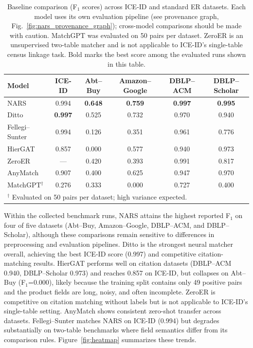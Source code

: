 \documentclass{article}
\begin{document}
\begin{table}[H]
  \centering
  \caption{Baseline comparison (F$_1$ scores) across ICE-ID and standard ER datasets. Each model uses its own evaluation pipeline (see provenance graph, Fig.~\ref{fig:nars_provenance_graph}); cross-model comparisons should be made with caution. MatchGPT was evaluated on 50 pairs per dataset. ZeroER is an unsupervised two-table matcher and is not applicable to ICE-ID's single-table census linkage task. Bold marks the best score among the evaluated runs shown in this table.}
  \label{tab:comprehensive_baselines}
  \begin{tabular}{lccccc}
    \toprule
    \textbf{Model} & \textbf{ICE-ID} & \textbf{Abt--Buy} & \textbf{Amazon--Google} & \textbf{DBLP--ACM} & \textbf{DBLP--Scholar} \\
    \midrule
    NARS & 0.994 & \textbf{0.648} & \textbf{0.759} & \textbf{0.997} & \textbf{0.995} \\
    Ditto & \textbf{0.997} & 0.525 & 0.732 & 0.970 & 0.940 \\
    Fellegi--Sunter & 0.994 & 0.126 & 0.351 & 0.961 & 0.776 \\
    HierGAT & 0.857 & 0.000 & 0.577 & 0.940 & 0.973 \\
    ZeroER & --- & 0.420 & 0.393 & 0.991 & 0.817 \\
    AnyMatch & 0.907 & 0.400 & 0.625 & 0.947 & 0.970 \\
    MatchGPT$^\dagger$ & 0.276 & 0.333 & 0.000 & 0.727 & 0.400 \\
    \bottomrule
    \multicolumn{6}{l}{\scriptsize $^\dagger$ Evaluated on 50 pairs per dataset; high variance expected.}
  \end{tabular}
\end{table}

Within the collected benchmark runs, NARS attains the highest reported F$_1$ on four of five datasets (Abt--Buy, Amazon--Google, DBLP--ACM, and DBLP--Scholar), although these comparisons remain sensitive to differences in preprocessing and evaluation pipelines. Ditto is the strongest neural matcher overall, achieving the best ICE-ID score (0.997) and competitive citation-matching results. HierGAT performs well on citation datasets (DBLP--ACM 0.940, DBLP--Scholar 0.973) and reaches 0.857 on ICE-ID, but collapses on Abt--Buy (F$_1$=0.000), likely because the training split contains only 49 positive pairs and the product fields are long, noisy, and often incomplete. ZeroER is competitive on citation matching without labels but is not applicable to ICE-ID's single-table setting. AnyMatch shows consistent zero-shot transfer across datasets. Fellegi--Sunter matches NARS on ICE-ID (0.994) but degrades substantially on two-table benchmarks where field semantics differ from its comparison rules. Figure~\ref{fig:heatmap} summarizes these trends.
\end{document}
